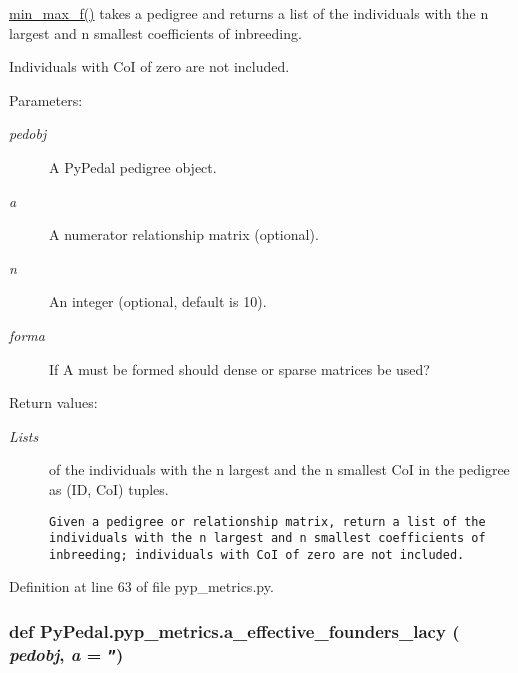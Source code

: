 \hyperlink{namespacePyPedal_1_1pyp__metrics_f92db7d70e697a1f299c1b01775e9378}{min\_\-max\_\-f()} takes a pedigree and returns a list of the individuals with the n largest and n smallest coefficients of inbreeding. 

Individuals with Co\-I of zero are not included. \begin{Desc}
\item[Parameters:]
\begin{description}
\item[{\em pedobj}]A Py\-Pedal pedigree object. \item[{\em a}]A numerator relationship matrix (optional). \item[{\em n}]An integer (optional, default is 10). \item[{\em forma}]If A must be formed should dense or sparse matrices be used? \end{description}
\end{Desc}
\begin{Desc}
\item[Return values:]
\begin{description}
\item[{\em Lists}]of the individuals with the n largest and the n smallest Co\-I in the pedigree as (ID, Co\-I) tuples.

\footnotesize\begin{verbatim}Given a pedigree or relationship matrix, return a list of the
individuals with the n largest and n smallest coefficients of
inbreeding; individuals with CoI of zero are not included.
\end{verbatim}
\normalsize
 \end{description}
\end{Desc}


Definition at line 63 of file pyp\_\-metrics.py.\hypertarget{namespacePyPedal_1_1pyp__metrics_3e7338b4892ff4cdedeb907a08114414}{
\subsubsection[a\_\-effective\_\-founders\_\-lacy]{\setlength{\rightskip}{0pt plus 5cm}def Py\-Pedal.pyp\_\-metrics.a\_\-effective\_\-founders\_\-lacy ( {\em pedobj},  {\em a} = {\tt ''})}}
\label{namespacePyPedal_1_1pyp__metrics_3e7338b4892ff4cdedeb907a08114414}



